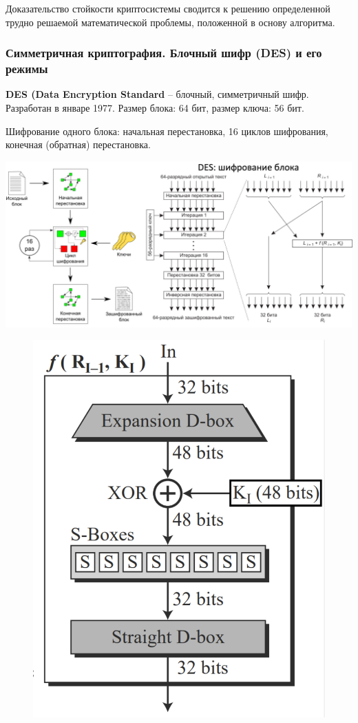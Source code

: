 Доказательство стойкости криптосистемы сводится к решению определенной трудно решаемой математической проблемы, положенной в основу алгоритма.

\subsubsection{Симметричная криптография. Блочный шифр (DES) и его режимы}

\textbf{DES (Data Encryption Standard} -- блочный, симметричный шифр. Разработан в январе 1977. Размер блока: 64 бит, размер ключа: 56 бит.

Шифрование одного блока: начальная перестановка, 16 циклов шифрования, конечная (обратная) перестановка.

\includegraphics[width=\linewidth]{pics/DES.png}

\begin{figure}
\vspace{-4.5ex}
\includegraphics[scale=0.2]{pics/DES_cipher.png}
\end{figure}

